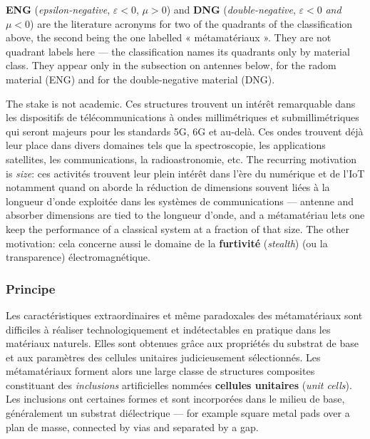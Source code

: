 \begin{remark}
  \textbf{ENG} (\textit{epsilon-negative}, $\varepsilon < 0$, $\mu > 0$) and
  \textbf{DNG} (\textit{double-negative}, $\varepsilon < 0$ \emph{and}
  $\mu < 0$) are the literature acronyms for two of the quadrants of the
  classification above, the second being the one labelled « métamatériaux ».
  They are not quadrant labels here --- the classification names its
  quadrants only by material class. They appear only in the subsection on
  antennes below, for the radom material (ENG) and for the double-negative
  material (DNG).
\end{remark}

The stake is not academic. Ces structures trouvent un intérêt remarquable dans
les dispositifs de télécommunications à ondes millimétriques et
submillimétriques qui seront majeurs pour les standards 5G, 6G et au-delà. Ces
ondes trouvent déjà leur place dans divers domaines tels que la spectroscopie,
les applications satellites, les communications, la radioastronomie, etc. The
recurring motivation is \emph{size}: ces activités trouvent leur plein intérêt
dans l'ère du numérique et de l'IoT notamment quand on aborde la réduction de
dimensions souvent liées à la longueur d'onde exploitée dans les systèmes de
communications --- antenne and absorber dimensions are tied to the longueur
d'onde, and a métamatériau lets one keep the performance of a classical system
at a fraction of that size. The other motivation: cela concerne aussi le
domaine de la \textbf{furtivité} (\textit{stealth}) (ou la transparence)
électromagnétique.

\subsubsection{Principe}

Les caractéristiques extraordinaires et même paradoxales des métamatériaux sont
difficiles à réaliser technologiquement et indétectables en pratique dans les
matériaux naturels. Elles sont obtenues grâce aux propriétés du substrat de base
et aux paramètres des cellules unitaires judicieusement sélectionnés. Les
métamatériaux forment alors une large classe de structures composites
constituant des \emph{inclusions} artificielles nommées \textbf{cellules
unitaires} (\textit{unit cells}). Les inclusions ont certaines formes et sont
incorporées dans le milieu de base, généralement un substrat diélectrique ---
for example square metal pads over a plan de masse, connected by vias and
separated by a gap.

